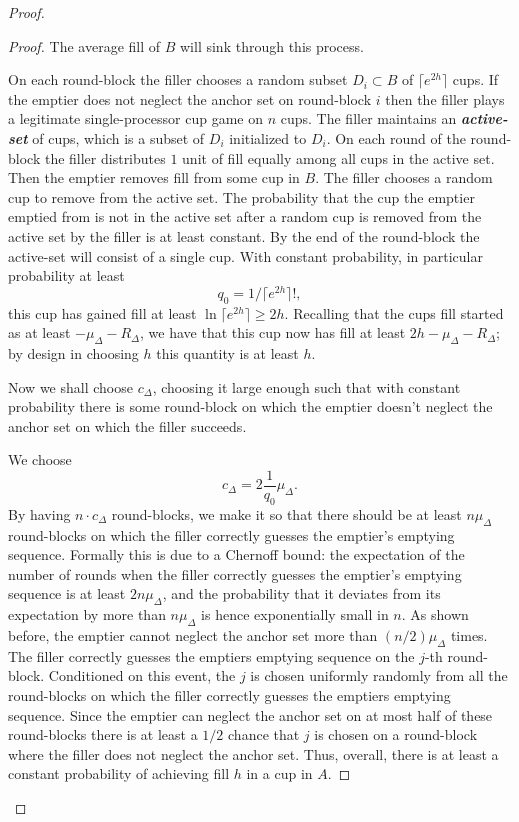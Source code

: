 \documentclass[twocolumn]{article}[10pt]
\newcommand{\defn}[1]{{\textit{\textbf{\boldmath #1}}}\xspace}
\begin{document}
\begin{proof}
\begin{proof}
{\color{blue}
  The average fill of $B$ will sink through this process. 
}

  On each round-block the filler chooses a random subset $D_i \subset B$ of
  $\lceil e^{2h} \rceil$ cups. If the emptier does not neglect the anchor set
  on round-block $i$ then the filler plays a legitimate single-processor cup
  game on $n$ cups. The filler maintains an \defn{active-set} of cups, which is
  a subset of $D_i$ initialized to $D_i$. On each round of the round-block the
  filler distributes $1$ unit of fill equally among all cups in the active set.
  Then the emptier removes fill from some cup in $B$. The filler chooses a
  random cup to remove from the active set. The probability that the cup the
  emptier emptied from is not in the active set after a random cup is removed
  from the active set by the filler is at least constant. By the end of the
  round-block the active-set will consist of a single cup. With constant
  probability, in particular probability at least $$q_0 = 1/\lceil e^{2h}
  \rceil!,$$ this cup has gained fill at least $\ln \lceil e^{2h} \rceil \ge
  2h$. Recalling that the cups fill started as at least $-\mu_\Delta-R_\Delta$,
  we have that this cup now has fill at least $2h-\mu_\Delta-R_\Delta$; by
  design in choosing $h$ this quantity is at least $h$. 

  Now we shall choose $c_\Delta$, choosing it large enough such that with
  constant probability there is some round-block on which the emptier doesn't
  neglect the anchor set on which the filler succeeds.

  We choose $$c_\Delta = 2\frac{1}{q_0}\mu_\Delta.$$ By having $n\cdot
  c_\Delta$ round-blocks, we make it so that there should be at least
  $n\mu_\Delta$ round-blocks on which the filler correctly guesses the
  emptier's emptying sequence. Formally this is due to a Chernoff bound: the
  expectation of the number of rounds when the filler correctly guesses the
  emptier's emptying sequence is at least $2n\mu_\Delta$, and the probability
  that it deviates from its expectation by more than $n\mu_\Delta$ is hence
  exponentially small in $n$. As shown before, the emptier cannot neglect the
  anchor set more than $(n/2)\mu_\Delta$ times. The filler correctly guesses
  the emptiers emptying sequence on the $j$-th round-block. Conditioned on this
  event, the $j$ is chosen uniformly randomly from all the round-blocks on
  which the filler correctly guesses the emptiers emptying sequence. Since the
  emptier can neglect the anchor set on at most half of these round-blocks
  there is at least a $1/2$ chance that $j$ is chosen on a round-block where
  the filler does not neglect the anchor set. Thus, overall, there is at least a
  constant probability of achieving fill $h$ in a cup in $A$.


\end{proof}
\end{proof}
\end{document}
